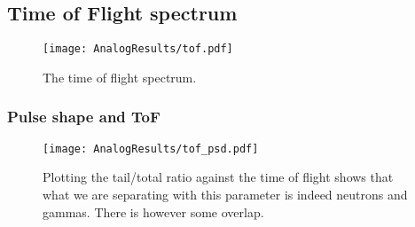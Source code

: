 \documentclass[main.tex]{subfiles}
\begin{document}
\subsection{Time of Flight spectrum}
\begin{figure}[ht]
    \centering
        \texttt{[image: AnalogResults/tof.pdf]}
        \caption{The time of flight spectrum.}
    \label{fig:A_TOF}
\end{figure}

\subsubsection{Pulse shape and ToF}
\begin{figure}[h]
    \centering
        \texttt{[image: AnalogResults/tof\_psd.pdf]}
        \caption{Plotting the tail/total ratio against the time of flight shows that what we are separating with this parameter is indeed neutrons and gammas. There is however some overlap.}
    \label{fig:tof_ps_a} 
\end{figure}
\end{document}
